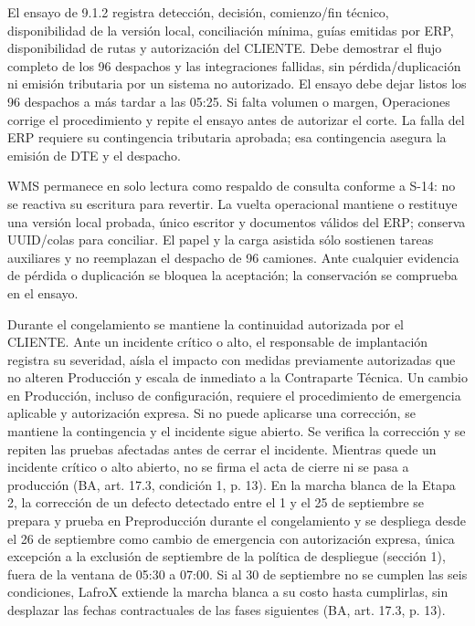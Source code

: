 El ensayo de 9.1.2 registra detección, decisión, comienzo/fin técnico, disponibilidad de la versión local, conciliación mínima, guías emitidas por ERP, disponibilidad de rutas y autorización del CLIENTE. Debe demostrar el flujo completo de los 96 despachos y las integraciones fallidas, sin pérdida/duplicación ni emisión tributaria por un sistema no autorizado. El ensayo debe dejar listos los 96 despachos a más tardar a las 05:25. Si falta volumen o margen, Operaciones corrige el procedimiento y repite el ensayo antes de autorizar el corte. La falla del ERP requiere su contingencia tributaria aprobada; esa contingencia asegura la emisión de DTE y el despacho.

WMS permanece en solo lectura como respaldo de consulta conforme a S-14: no se reactiva su escritura para revertir. La vuelta operacional mantiene o restituye una versión local probada, único escritor y documentos válidos del ERP; conserva UUID/colas para conciliar. El papel y la carga asistida sólo sostienen tareas auxiliares y no reemplazan el despacho de 96 camiones. Ante cualquier evidencia de pérdida o duplicación se bloquea la aceptación; la conservación se comprueba en el ensayo.

Durante el congelamiento se mantiene la continuidad autorizada por el CLIENTE. Ante un incidente crítico o alto, el responsable de implantación registra su severidad, aísla el impacto con medidas previamente autorizadas que no alteren Producción y escala de inmediato a la Contraparte Técnica. Un cambio en Producción, incluso de configuración, requiere el procedimiento de emergencia aplicable y autorización expresa. Si no puede aplicarse una corrección, se mantiene la contingencia y el incidente sigue abierto. Se verifica la corrección y se repiten las pruebas afectadas antes de cerrar el incidente. Mientras quede un incidente crítico o alto abierto, no se firma el acta de cierre ni se pasa a producción (BA, art. 17.3, condición 1, p. 13). En la marcha blanca de la Etapa 2, la corrección de un defecto detectado entre el 1 y el 25 de septiembre se prepara y prueba en Preproducción durante el congelamiento y se despliega desde el 26 de septiembre como cambio de emergencia con autorización expresa, única excepción a la exclusión de septiembre de la política de despliegue (sección 1), fuera de la ventana de 05:30 a 07:00. Si al 30 de septiembre no se cumplen las seis condiciones, LafroX extiende la marcha blanca a su costo hasta cumplirlas, sin desplazar las fechas contractuales de las fases siguientes (BA, art. 17.3, p. 13).

